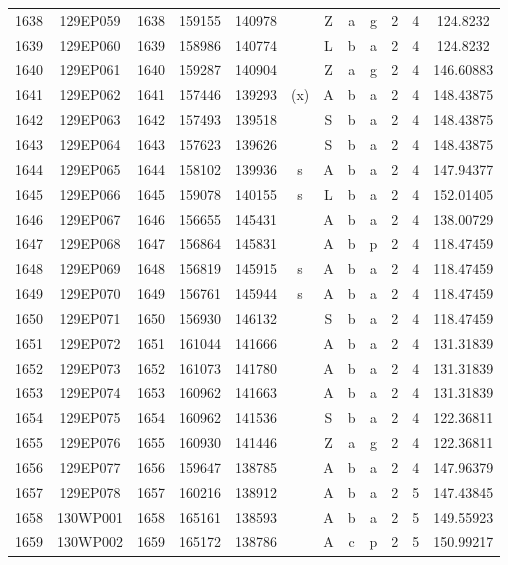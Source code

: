 \begin{tabular}{|*{12}{c|}}
1638 & 129EP059 & 1638 & 159155 & 140978 &  & Z & a & g & 2 & 4 & 124.8232 \\ 
1639 & 129EP060 & 1639 & 158986 & 140774 &  & L & b & a & 2 & 4 & 124.8232 \\ 
1640 & 129EP061 & 1640 & 159287 & 140904 &  & Z & a & g & 2 & 4 & 146.60883 \\ 
1641 & 129EP062 & 1641 & 157446 & 139293 & (x) & A & b & a & 2 & 4 & 148.43875 \\ 
1642 & 129EP063 & 1642 & 157493 & 139518 &  & S & b & a & 2 & 4 & 148.43875 \\ 
1643 & 129EP064 & 1643 & 157623 & 139626 &  & S & b & a & 2 & 4 & 148.43875 \\ 
1644 & 129EP065 & 1644 & 158102 & 139936 & s & A & b & a & 2 & 4 & 147.94377 \\ 
1645 & 129EP066 & 1645 & 159078 & 140155 & s & L & b & a & 2 & 4 & 152.01405 \\ 
1646 & 129EP067 & 1646 & 156655 & 145431 &  & A & b & a & 2 & 4 & 138.00729 \\ 
1647 & 129EP068 & 1647 & 156864 & 145831 &  & A & b & p & 2 & 4 & 118.47459 \\ 
1648 & 129EP069 & 1648 & 156819 & 145915 & s & A & b & a & 2 & 4 & 118.47459 \\ 
1649 & 129EP070 & 1649 & 156761 & 145944 & s & A & b & a & 2 & 4 & 118.47459 \\ 
1650 & 129EP071 & 1650 & 156930 & 146132 &  & S & b & a & 2 & 4 & 118.47459 \\ 
1651 & 129EP072 & 1651 & 161044 & 141666 &  & A & b & a & 2 & 4 & 131.31839 \\ 
1652 & 129EP073 & 1652 & 161073 & 141780 &  & A & b & a & 2 & 4 & 131.31839 \\ 
1653 & 129EP074 & 1653 & 160962 & 141663 &  & A & b & a & 2 & 4 & 131.31839 \\ 
1654 & 129EP075 & 1654 & 160962 & 141536 &  & S & b & a & 2 & 4 & 122.36811 \\ 
1655 & 129EP076 & 1655 & 160930 & 141446 &  & Z & a & g & 2 & 4 & 122.36811 \\ 
1656 & 129EP077 & 1656 & 159647 & 138785 &  & A & b & a & 2 & 4 & 147.96379 \\ 
1657 & 129EP078 & 1657 & 160216 & 138912 &  & A & b & a & 2 & 5 & 147.43845 \\ 
1658 & 130WP001 & 1658 & 165161 & 138593 &  & A & b & a & 2 & 5 & 149.55923 \\ 
1659 & 130WP002 & 1659 & 165172 & 138786 &  & A & c & p & 2 & 5 & 150.99217 \\ 

\end{tabular}
